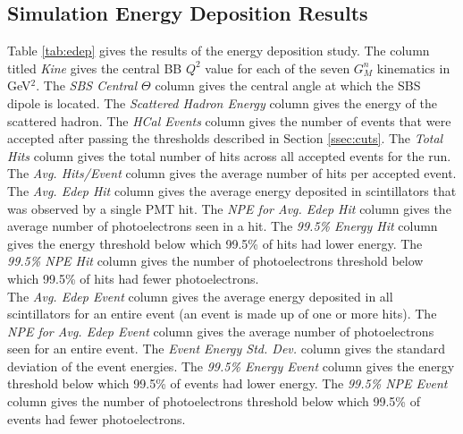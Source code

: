 \documentclass[10pt]{article}
\begin{document}
\subsection{Simulation Energy Deposition Results}

Table \ref{tab:edep} gives the results of the energy deposition study. The column titled \textit{Kine} gives the central BB $Q^2$ value for each of the seven $G_M^n$ kinematics in GeV$^2$. The \textit{SBS Central $\Theta$} column gives the central angle at which the SBS dipole is located. The \textit{Scattered Hadron Energy} column gives the energy of the scattered hadron. The \textit{HCal Events} column gives the number of events that were accepted after passing the thresholds described in Section \ref{ssec:cuts}. The \textit{Total Hits} column gives the total number of hits across all accepted events for the run. The \textit{Avg. Hits/Event} column gives the average number of hits per accepted event.\\

The \textit{Avg. Edep Hit} column gives the average energy deposited in scintillators that was observed by a single PMT hit. The \textit{NPE for Avg. Edep Hit} column gives the average number of photoelectrons seen in a hit. The \textit{99.5\% Energy Hit} column gives the energy threshold below which 99.5\% of hits had lower energy. The \textit{99.5\% NPE Hit} column gives the number of photoelectrons threshold below which 99.5\% of hits had fewer photoelectrons.\\

The \textit{Avg. Edep Event} column gives the average energy deposited in all scintillators for an entire event (an event is made up of one or more hits). The \textit{NPE for Avg. Edep Event} column gives the average number of photoelectrons seen for an entire event. The \textit{Event Energy Std. Dev.} column gives the standard deviation of the event energies. The \textit{99.5\% Energy Event} column gives the energy threshold below which 99.5\% of events had lower energy. The \textit{99.5\% NPE Event} column gives the number of photoelectrons threshold below which 99.5\% of events had fewer photoelectrons.\\

\end{document}
